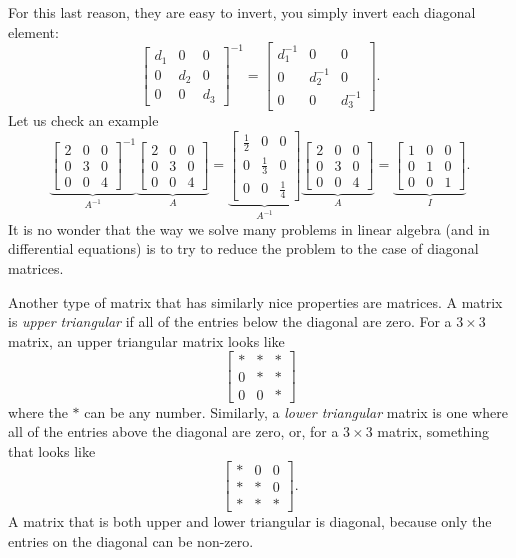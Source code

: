 For this last reason, they are easy to invert, you simply invert
each diagonal element:
\begin{equation*}
\begin{bmatrix}
d_1 & 0 & 0 \\
0 & d_2 & 0 \\
0 & 0 & d_3 
\end{bmatrix}^{-1}
=
\begin{bmatrix}
d_1^{-1} & 0 & 0 \\
0 & d_2^{-1} & 0 \\
0 & 0 & d_3^{-1} 
\end{bmatrix} .
\end{equation*}
Let us check an example
\begin{equation*}
\underbrace{
\begin{bmatrix}
2 & 0 & 0 \\
0 & 3 & 0 \\
0 & 0 & 4 
\end{bmatrix}^{-1}
}_{A^{-1}}
\underbrace{
\begin{bmatrix}
2 & 0 & 0 \\
0 & 3 & 0 \\
0 & 0 & 4 
\end{bmatrix}
}_{A}
=
\underbrace{
\begin{bmatrix}
\frac{1}{2} & 0 & 0 \\
0 & \frac{1}{3} & 0 \\
0 & 0 & \frac{1}{4} 
\end{bmatrix}
}_{A^{-1}}
\underbrace{
\begin{bmatrix}
2 & 0 & 0 \\
0 & 3 & 0 \\
0 & 0 & 4 
\end{bmatrix}
}_{A}
=
\underbrace{
\begin{bmatrix}
1 & 0 & 0 \\
0 & 1 & 0 \\
0 & 0 & 1 
\end{bmatrix}
}_{I} .
\end{equation*}
It is no wonder that the way we solve many problems in linear algebra
(and in differential equations) is to try to reduce the problem to the
case of diagonal matrices.

Another type of matrix that has similarly nice properties are \emph{} matrices. A matrix is
\emph{upper triangular} if all of the entries below the diagonal are zero. For a $3\times 3$ matrix, an upper triangular matrix 
looks like
\[ \begin{bmatrix} * & * & * \\ 0 & * & * \\ 0 & 0 & * \end{bmatrix} \] where the $*$ can be any number. Similarly, a \emph{lower triangular} matrix is one where all of the entries above the diagonal are zero, or, for a $3 \times 3$ matrix, something that looks like  
\[ \begin{bmatrix} * & 0 & 0 \\ * & * & 0 \\ * & * & * \end{bmatrix}. \] A matrix that is both upper and lower triangular is diagonal, because only the entries on the diagonal can be non-zero. 

